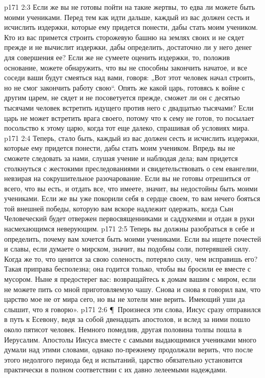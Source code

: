 \vs p171 2:3 Если же вы не готовы пойти на такие жертвы, то едва ли можете быть моими учениками. Перед тем как идти дальше, каждый из вас должен сесть и исчислить издержки, которые ему придется понести, дабы стать моим учеником. Кто из вас примется строить сторожевую башню на землях своих и не сядет прежде и не вычислит издержки, дабы определить, достаточно ли у него денег для совершения ее? Если же не сумеете оценить издержки, то, положив основание, можете обнаружить, что вы не способны закончить начатое, и все соседи ваши будут смеяться над вами, говоря: „Вот этот человек начал строить, но не смог закончить работу свою“. Опять же какой царь, готовясь к войне с другим царем, не сядет и не посоветуется прежде, сможет ли он с десятью тысячами человек встретить идущего против него с двадцатью тысячами? Если царь не может встретить врага своего, потому что к сему не готов, то посылает посольство к этому царю, когда тот еще далеко, спрашивая об условиях мира.
\vs p171 2:4 Теперь, стало быть, каждый из вас должен сесть и исчислить издержки, которые ему придется понести, дабы стать моим учеником. Впредь вы не сможете следовать за нами, слушая учение и наблюдая дела; вам придется столкнуться с жестокими преследованиями и свидетельствовать о сем евангелии, невзирая на сокрушительное разочарование. Если вы не готовы отрешиться от всего, что вы есть, и отдать все, что имеете, значит, вы недостойны быть моими учениками. Если же вы уже покорили себя в сердце своем, то вам нечего бояться той внешней победы, которую вам вскоре надлежит одержать, когда Сын Человеческий будет отвержен первосвященниками и саддукеями и отдан в руки насмехающимся неверующим.
\vs p171 2:5 Теперь вы должны разобраться в себе и определить, почему вам хочется быть моими учениками. Если вы ищете почестей и славы, если думаете о мирском, значит, вы подобны соли, потерявшей силу. Когда же то, что ценится за свою соленость, потеряло силу, чем исправишь его? Такая приправа бесполезна; она годится только, чтобы вы бросили ее вместе с мусором. Ныне я предостерег вас: возвращайтесь к домам вашим с миром, если не можете пить со мной приготовляемую чашу. Снова и снова я говорил вам, что царство мое не от мира сего, но вы не хотели мне верить. Имеющий уши да слышит, что я говорю».
\vs p171 2:6 \P\ Произнеся эти слова, Иисус сразу отправился в путь к Есевону, ведя за собой двенадцать апостолов, и вслед за ними пошло около пятисот человек. Немного помедлив, другая половина толпы пошла в Иерусалим. Апостолы Иисуса вместе с самыми выдающимися учениками много думали над этими словами, однако по\hyp{}прежнему продолжали верить, что после этого недолгого периода бед и испытаний, царство обязательно установится практически в полном соответствии с их давно лелеемыми надеждами.
